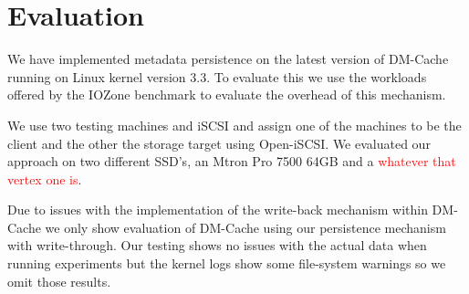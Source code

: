 \section{Evaluation}
\label{sec:evaluation}

We have implemented metadata persistence on the latest version of
DM-Cache running on Linux kernel version 3.3. To evaluate this we use
the workloads offered by the IOZone benchmark to evaluate the overhead
of this mechanism.

We use two testing machines and iSCSI and assign one of the machines
to be the client and the other the storage target using Open-iSCSI. We
evaluated our approach on two different SSD's, an Mtron Pro 7500 64GB
and a \textcolor{red}{whatever that vertex one is}.

Due to issues with the implementation of the write-back mechanism
within DM-Cache we only show evaluation of DM-Cache using our
persistence mechanism with write-through. Our testing shows no issues
with the actual data when running experiments but the kernel logs show
some file-system warnings so we omit those results.
